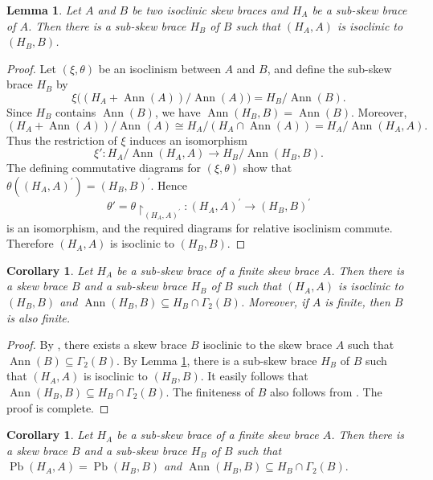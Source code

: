 \documentclass[10pt,a4paper]{amsart}
\numberwithin{equation}{section}
\newtheorem{cor}[equation]{Corollary}
\newtheorem{lem}[equation]{Lemma}
\newcommand{\Pb}{\operatorname{Pb} }
\newcommand{\Ann}{\operatorname{Ann} }
\begin{document}
\begin{lem}\label{sub-skew brace isoclinic}
    Let $A$ and $B$ be two isoclinic skew braces and $H_A$ be a sub-skew brace of $A$. Then there is a sub-skew brace $H_B$ of $B$ such that $(H_A,A) $ is isoclinic to $(H_B,B)$.
\end{lem}
\begin{proof}
    Let $(\xi,\theta)$ be an isoclinism between $A$ and $B$, and define the sub-skew brace $H_B$ by
    $$
    \xi\big((H_A+\Ann(A))/\Ann(A)\big)=H_B/\Ann(B).
    $$
    Since $H_B$ contains $\Ann(B)$, we have $\Ann(H_B,B)=\Ann(B)$. Moreover,
    $$
    (H_A+\Ann(A))/\Ann(A) \cong H_A/(H_A\cap\Ann(A))
    =H_A/\Ann(H_A,A).
    $$
    Thus the restriction of $\xi$ induces an isomorphism
    $$
    \xi':H_A/\Ann(H_A,A)\longrightarrow H_B/\Ann(H_B,B).
    $$
    The defining commutative diagrams for $(\xi,\theta)$ show that
    $\theta((H_A,A)^\prime)=(H_B,B)^\prime$. Hence
    $$
    \theta'=\theta{\restriction}_{(H_A,A)^\prime}:(H_A,A)^\prime\longrightarrow(H_B,B)^\prime
    $$
    is an isomorphism, and the required diagrams for relative isoclinism commute. Therefore $(H_A,A)$ is isoclinic to $(H_B,B)$.
\end{proof}



\begin{cor}\label{existance of relative stem}
    Let $H_A$ be a sub-skew brace of a finite skew brace $A$. Then there is a skew brace $B$ and a sub-skew brace $H_B$ of $B$ such that $(H_A,A) $ is isoclinic to $(H_B,B) $ and $\Ann(H_B,B)\subseteq H_B\cap \Gamma_2(B)$. Moreover, if $A$ is finite, then $B$ is also finite.
\end{cor}
\begin{proof}
    By \cite[Theorem 2.18]{LV24}, there exists a skew brace $B$ isoclinic to the skew brace $A$ such that $\Ann(B)\subseteq \Gamma_2(B)$. By Lemma \ref{sub-skew brace isoclinic}, there is a sub-skew brace $H_B$ of $B$ such that $(H_A,A) $ is isoclinic to $(H_B,B)$. It easily follows that $\Ann(H_B,B)\subseteq H_B\cap \Gamma_2(B)$. The finiteness of $B$ also follows from \cite{LV24}.  The proof is complete. 
\end{proof}

\begin{cor}
    Let $H_A$ be a sub-skew brace of a finite skew brace $A$. Then there is a skew brace $B$ and a sub-skew brace $H_B$ of $B$ such that $\Pb(H_A,A) = \Pb(H_B,B) $ and $\Ann(H_B,B)\subseteq H_B\cap \Gamma_2(B).$
\end{cor}
\end{document}
